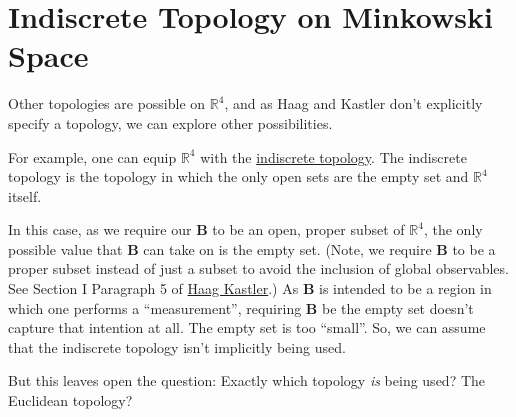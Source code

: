 \section{Indiscrete Topology on Minkowski Space}\label{sctn:indiscrete-topology-on-minkowski-space}
Other topologies are possible on $\mathbb{R}^4$, and as Haag and Kastler don't explicitly specify a topology, we can explore other possibilities.

For example, one can equip $\mathbb{R}^4$ with the \href{https://ncatlab.org/nlab/show/discrete+and+indiscrete+topology}{indiscrete topology}. The indiscrete topology is the topology in which the only open sets are the empty set and $\mathbb{R}^4$ itself.

In this case, as we require our $\mathbf{B}$ to be an open, proper subset of $\mathbb{R}^4$, the only possible value that $\mathbf{B}$ can take on is the empty set. (Note, we require $\mathbf{B}$ to be a proper subset instead of just a subset to avoid the inclusion of global observables. See Section I Paragraph 5 of \href{https://doi.org/10.1063/1.1704187}{Haag Kastler}.) As $\mathbf{B}$ is intended to be a region in which one performs a ``measurement'', requiring $\mathbf{B}$ be the empty set doesn't capture that intention at all. The empty set is too ``small''.  So, we can assume that the indiscrete topology isn't implicitly being used.

But this leaves open the question: Exactly which topology \textit{is} being used? The Euclidean topology?
